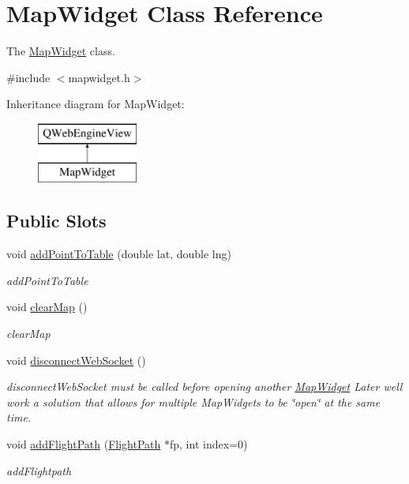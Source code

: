\hypertarget{class_map_widget}{}\section{Map\+Widget Class Reference}
\label{class_map_widget}


The \hyperlink{class_map_widget}{Map\+Widget} class.  




{\ttfamily \#include $<$mapwidget.\+h$>$}

Inheritance diagram for Map\+Widget\+:\begin{figure}[H]
\begin{center}
\leavevmode
\includegraphics[height=2.000000cm]{class_map_widget}
\end{center}
\end{figure}
\subsection*{Public Slots}
\begin{DoxyCompactItemize}
\item 
void \hyperlink{class_map_widget_a2f3f6349372d8d625526ee5ebb69abbb}{add\+Point\+To\+Table} (double lat, double lng)
\begin{DoxyCompactList}\small\item\em add\+Point\+To\+Table \end{DoxyCompactList}\item 
void \hyperlink{class_map_widget_a6d02fd8c98000b25d65c18860dd24798}{clear\+Map} ()
\begin{DoxyCompactList}\small\item\em clear\+Map \end{DoxyCompactList}\item 
void \hyperlink{class_map_widget_a1334377e2cdd9b97c499880a3327c25d}{disconnect\+Web\+Socket} ()
\begin{DoxyCompactList}\small\item\em disconnect\+Web\+Socket must be called before opening another \hyperlink{class_map_widget}{Map\+Widget} Later we\textquotesingle{}ll work a solution that allows for multiple Map\+Widgets to be \char`\"{}open\char`\"{} at the same time. \end{DoxyCompactList}\item 
void \hyperlink{class_map_widget_a28767584fd020d5a2bdd634812de4ac9}{add\+Flight\+Path} (\hyperlink{class_flight_path}{Flight\+Path} $\ast$fp, int index=0)
\begin{DoxyCompactList}\small\item\em add\+Flightpath \end{DoxyCompactList}\end{DoxyCompactItemize}
